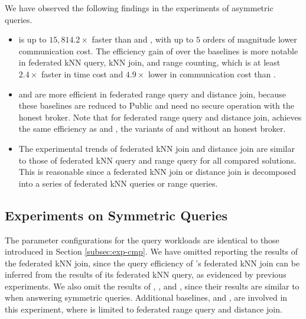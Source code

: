 We have observed the following findings in the experiments of asymmetric queries.
\begin{itemize}
    \item \sysname is up to $15,814.2\times$ faster than \smcql and \conclave, with up to $5$ orders of magnitude lower communication cost.
    The efficiency gain of \sysname over the baselines is more notable in federated kNN query, kNN join, and range counting, which is at least $2.4\times$ faster in time cost and $4.9\times$ lower in communication cost than \conclave.
    
    \item \smcql and \conclave are more efficient in federated range query and distance join,
    because these baselines are reduced to Public and need no secure operation with the honest broker.
    Note that for federated range query and distance join, \sysname achieves the same efficiency as \smcqlext and \conclaveext, the variants of \smcql and \conclave without an honest broker. 
    
    \item The experimental trends of federated kNN join and distance join are similar to those of federated kNN query and range query for all compared solutions.
    This is reasonable since a federated kNN join or distance join is decomposed into a series of federated kNN queries or range queries.
\end{itemize}

\subsection{Experiments on Symmetric Queries}
\label{subsec:exp-symmetric}

The parameter configurations for the query workloads are identical to those introduced in Section \ref{subsec:exp-cmp}.
We have omitted reporting the results of the federated kNN join,
since the query efficiency of \sysname's federated kNN join can be inferred from the results of its federated kNN query, as evidenced by previous experiments.
We also omit the results of \smcql, \smcqlext, and \conclaveext, since their results are similar to \conclave when answering symmetric queries.
Additional baselines, \EDBT \cite{DBLP:conf/edbt/KesarwaniKNPSMM18} and \ICDE \cite{DBLP:conf/icde/SahinAAAP18}, are involved in this experiment, where \ICDE is limited to federated range query and distance join.

